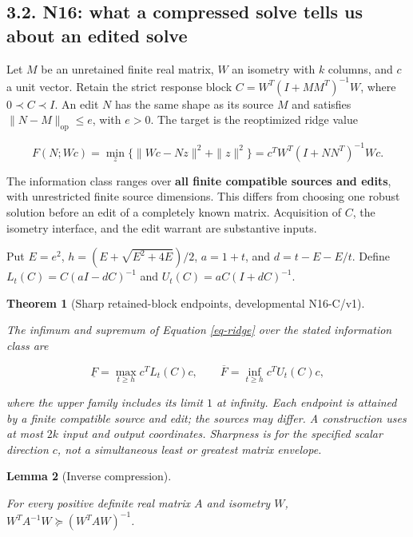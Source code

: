 \documentclass{article}
\newtheorem{theorem}{Theorem}
\newtheorem{lemma}[theorem]{Lemma}
\theoremstyle{definition}
\begin{document}
\subsection{3.2. N16: what a compressed solve tells us about an edited
solve}\label{sec-n16}

Let \(M\) be an unretained finite real matrix, \(W\) an isometry with
\(k\) columns, and \(c\) a unit vector. Retain the strict response block
\(C=W^T(I+MM^T)^{-1}W\), where \(0\prec C\prec I\). An edit \(N\) has
the same shape as its source \(M\) and satisfies
\(\|N-M\|_{\mathrm{op}}\leq e\), with \(e>0\). The target is the
reoptimized ridge value

\begin{equation}
F(N;Wc)=\min_z\{\|Wc-Nz\|^2+\|z\|^2\}
        =c^TW^T(I+NN^T)^{-1}Wc.
 \label{eq-ridge}
\end{equation}

The information class ranges over \textbf{all finite compatible sources
and edits}, with unrestricted finite source dimensions. This differs
from choosing one robust solution before an edit of a completely known
matrix. Acquisition of \(C\), the isometry interface, and the edit
warrant are substantive inputs.

Put \(E=e^2\), \(h=(E+\sqrt{E^2+4E})/2\), \(a=1+t\), and \(d=t-E-E/t\).
Define \(L_t(C)=C(aI-dC)^{-1}\) and \(U_t(C)=aC(I+dC)^{-1}\).

\begin{theorem}[Sharp retained-block endpoints, developmental N16-C/v1]\label{thm-n16}

The infimum and supremum of Equation \ref{eq-ridge} over the stated
information class are

\begin{equation}
\underline F=\max_{t\geq h}c^TL_t(C)c,
 \qquad
 \overline F=\inf_{t\geq h}c^TU_t(C)c,
 \label{eq-n16}
\end{equation}

where the upper family includes its limit \(1\) at infinity. Each
endpoint is attained by a finite compatible source and edit; the sources
may differ. A construction uses at most \(2k\) input and output
coordinates. Sharpness is for the specified scalar direction \(c\), not
a simultaneous least or greatest matrix envelope.

\end{theorem}

\begin{lemma}[Inverse compression]\label{lem-compression}

For every positive definite real matrix \(A\) and isometry \(W\),
\(W^TA^{-1}W\succeq(W^TAW)^{-1}\).

\end{lemma}
\end{document}

